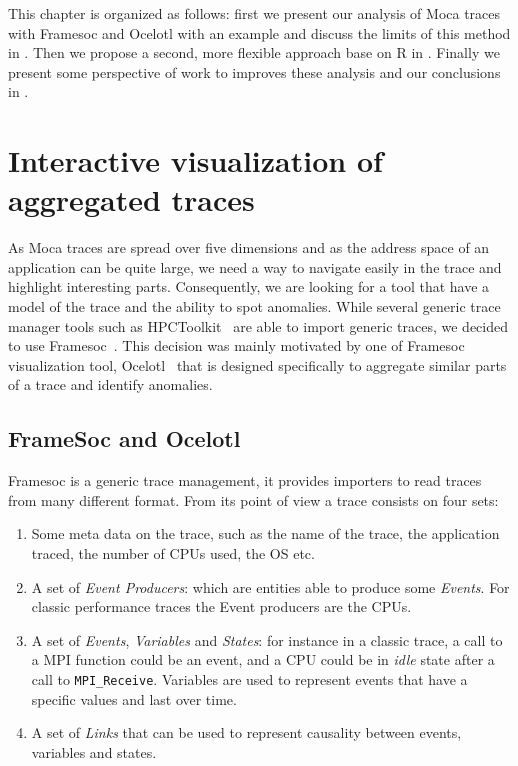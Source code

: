 This chapter is organized as follows: first we present our analysis of \gls{Moca} traces with \gls{Framesoc} and \gls{Ocelotl} with an example and discuss the limits of this method in .
Then we propose a second, more flexible approach base on \gls{R} in .
Finally we present some perspective of work to improves these analysis and our conclusions in .


\section{Interactive visualization of aggregated traces}
\label{sec:visu-first}

As \gls{Moca} traces are spread over five dimensions and as the address space of an application can be quite large, we need a way to navigate easily in the trace and highlight interesting parts.
Consequently, we are looking for a tool that have a model of the trace and the ability to spot anomalies.
While several generic trace manager tools such as \gls{HPCToolkit}~\cite{Adhianto10HPCTOOLKIT} are able to import generic traces, we decided to use \gls{Framesoc}~\cite{Pagano14frameSoC}.
This decision was mainly motivated by one of \gls{Framesoc} visualization tool, \gls{Ocelotl}~\cite{Dosimont14Ocelotl} that is designed specifically to aggregate similar parts of a trace and identify anomalies.

\subsection{FrameSoc and Ocelotl}

\gls{Framesoc} is a generic trace management, it provides importers to read traces from many different format.
From its point of view a trace consists on four sets:
\begin{enumerate}
    \item Some meta data on the trace, such as the name of the trace, the application traced, the number of \glspl{CPU} used, the \gls{OS} etc.
    \item A set of \emph{Event Producers}: which are entities able to produce some \emph{Events}.
        For classic performance traces the Event producers are the \glspl{CPU}.
    \item A set of \emph{Events}, \emph{Variables} and \emph{States}: for instance in a classic trace, a call to a \gls{MPI} function could be an event, and a \gls{CPU} could be in \emph{idle} state after a call to \texttt{MPI\_Receive}. Variables are used to represent events that have a specific values and last over time.
    \item A set of \emph{Links} that can be used to represent causality between events, variables and states.
\end{enumerate}

